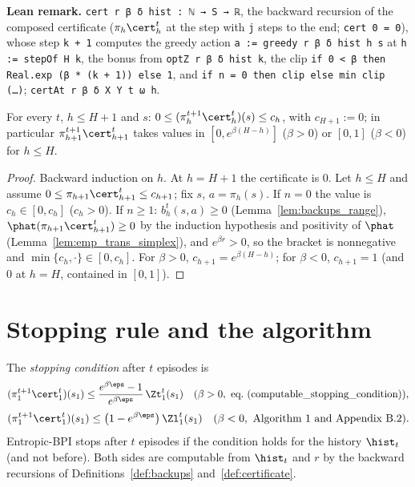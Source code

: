 \textbf{Lean remark.} \texttt{cert r β δ hist : ℕ → S → ℝ}, the backward recursion of the
composed certificate ($\pi_h \cert^t_h$ at the step with \texttt{j} steps to the end;
\texttt{cert 0 = 0}), whose step \texttt{k + 1} computes the greedy action
\texttt{a := greedy r β δ hist h s} at \texttt{h := stepOf H k}, the bonus from
\texttt{optZ r β δ hist k}, the clip \texttt{if 0 < β then Real.exp (β * (k + 1)) else 1}, and
\texttt{if n = 0 then clip else min clip (…)}; \texttt{certAt r β δ X Y t ω h}.

\begin{lemma}\label{lem:certificate_range}
\leanok
{}
For every $t$, $h \le H + 1$ and $s$: $0 \le (\pi^{t+1}_h \cert^t_h)(s) \le c_h$, with
$c_{H+1} := 0$; in particular $\pi^{t+1}_{h+1}\cert^t_{h+1}$ takes values in $[0, e^{\beta(H - h)}]$
($\beta > 0$) or $[0, 1]$ ($\beta < 0$) for $h \le H$.
\end{lemma}

\begin{proof}
\leanok
Backward induction on $h$. At $h = H + 1$ the certificate is $0$. Let $h \le H$ and assume
$0 \le \pi_{h+1}\cert^t_{h+1} \le c_{h+1}$; fix $s$, $a = \pi_h(s)$. If $n = 0$ the value is $c_h \in [0, c_h]$
($c_h > 0$). If $n \ge 1$: $b_h^t(s, a) \ge 0$ (Lemma~\ref{lem:backups_range}),
$\phat(\pi_{h+1}\cert^t_{h+1}) \ge 0$ by the induction hypothesis and positivity of $\phat$
(Lemma~\ref{lem:emp_trans_simplex}), and $e^{\beta r} > 0$, so the bracket is nonnegative and
$\min\{c_h, \cdot\} \in [0, c_h]$. For $\beta > 0$, $c_{h+1} = e^{\beta(H - h)}$; for $\beta < 0$, $c_{h+1} = 1$
(and $0$ at $h = H$, contained in $[0, 1]$).
\end{proof}

\section{Stopping rule and the algorithm}
\label{sec:algorithm_alg}

\begin{definition}\label{def:stopping_rule}
\leanok
{}
The \emph{stopping condition} after $t$ episodes is
\[
  (\pi^{t+1}_1 \cert^t_1)(s_1) \le \frac{e^{\beta\eps} - 1}{e^{\beta\eps}}\, \Zt^t_1(s_1)
  \quad (\beta > 0, \text{ eq.~(computable\_stopping\_condition)}),
\]
\[
  (\pi^{t+1}_1 \cert^t_1)(s_1) \le \big(1 - e^{\beta\eps}\big)\, \Zl^t_1(s_1)
  \quad (\beta < 0, \text{ Algorithm~1 and Appendix~B.2}).
\]
Entropic-BPI stops after $t$ episodes if the condition holds for the history $\hist_t$ (and not
before). Both sides are computable from $\hist_t$ and $r$ by the backward recursions of
Definitions~\ref{def:backups} and~\ref{def:certificate}.
\end{definition}

